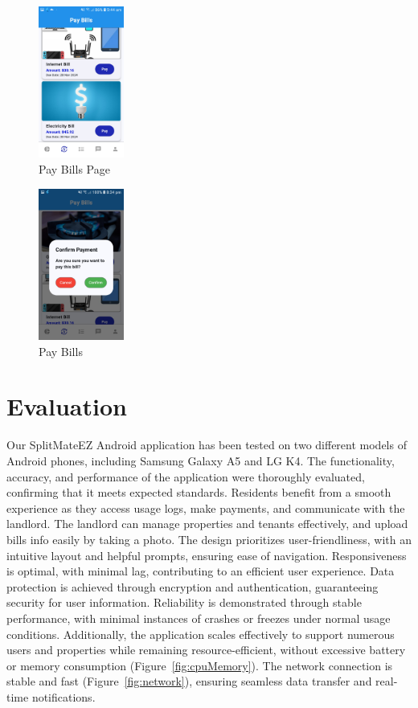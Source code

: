 \documentclass[sigconf,nonacm]{acmart}\settopmatter{printfolios=true}
\begin{document}
\begin{figure}[htbp]
  \centering
  \includegraphics[width=0.25\textwidth]{unpaidBills.jpg}
  \caption{Pay Bills Page}
  \label{fig:unpaidBills}
\end{figure}
\begin{figure}[htbp]
  \centering
  \includegraphics[width=0.25\textwidth]{payBill.jpg}
  \caption{Pay Bills}
  \label{fig:payBill}
\end{figure}

\section{Evaluation}
Our SplitMateEZ Android application has been tested on two different models of Android phones, including Samsung Galaxy A5 and LG K4. The functionality, accuracy, and performance of the application were thoroughly evaluated, confirming that it meets expected standards. Residents benefit from a smooth experience as they access usage logs, make payments, and communicate with the landlord. The landlord can manage properties and tenants effectively,  and upload bills info easily by taking a photo.
The design prioritizes user-friendliness, with an intuitive layout and helpful prompts, ensuring ease of navigation. Responsiveness is optimal, with minimal lag, contributing to an efficient user experience. Data protection is achieved through encryption and authentication, guaranteeing security for user information. Reliability is demonstrated through stable performance, with minimal instances of crashes or freezes under normal usage conditions. Additionally, the application scales effectively to support numerous users and properties while remaining resource-efficient, without excessive battery or memory consumption (Figure~\ref{fig:cpuMemory}). The network connection is stable and fast (Figure~\ref{fig:network}), ensuring seamless data transfer and real-time notifications. 
\end{document}
